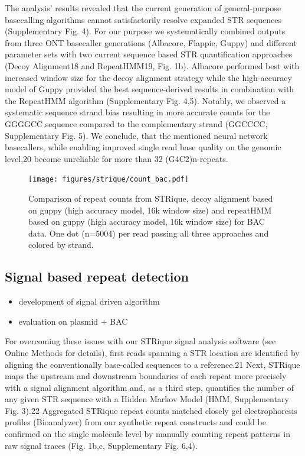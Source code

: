 The analysis’ results revealed that the current generation of general-purpose basecalling algorithms cannot satisfactorily resolve expanded STR sequences (Supplementary Fig. 4). For our purpose we systematically combined outputs from three ONT basecaller generations (Albacore, Flappie, Guppy) and different parameter sets with two current sequence based STR quantification approaches (Decoy Alignment18 and RepeatHMM19, Fig. 1b). Albacore performed best with increased window size for the decoy alignment strategy while the high-accuracy model of Guppy provided the best sequence-derived results in combination with the RepeatHMM algorithm (Supplementary Fig. 4,5). Notably, we observed a systematic sequence strand bias resulting in more accurate counts for the GGGGCC sequence compared to the complementary strand (GGCCCC, Supplementary Fig. 5). We conclude, that the mentioned neural network basecallers, while enabling improved single read base quality on the genomic level,20 become unreliable for more than 32 (G4C2)n-repeats.

\begin{figure}[h]
	\centering
	\texttt{[image: figures/strique/count\_bac.pdf]}
	\captionsetup{format=plain}
	\caption[Strand bias in sequence based repeat counts]{Comparison of repeat counts from STRique, decoy alignment based on guppy (high accuracy model, 16k window size) and repeatHMM based on guppy (high accuracy model, 16k window size) for BAC data. One dot (n=5004) per read passing all three approaches and colored by strand.}
	\label{fig:strique:count_bac}
\end{figure}




\subsection{Signal based repeat detection}
\label{subsec:strique:sig_repeat_counts}

\begin{itemize}
	\item development of signal driven algorithm
	\item evaluation on plasmid + BAC
\end{itemize}

For overcoming these issues with our STRique signal analysis software (see Online Methods for details), first reads spanning a STR location are identified by aligning the conventionally base-called sequences to a reference.21 Next, STRique maps the upstream and downstream boundaries of each repeat more precisely with a signal alignment algorithm and, as a third step, quantifies the number of any given STR sequence with a Hidden Markov Model (HMM, Supplementary Fig. 3).22 Aggregated STRique repeat counts matched closely gel electrophoresis profiles (Bioanalyzer) from our synthetic repeat constructs and could be confirmed on the single molecule level by manually counting repeat patterns in raw signal traces (Fig. 1b,c, Supplementary Fig. 6,4).

